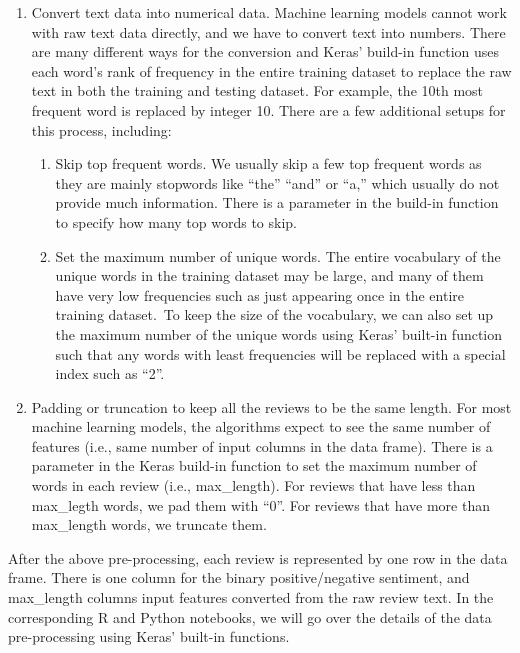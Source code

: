 \documentclass[
  12pt,
]{krantz}
\providecommand{\tightlist}{%
  \setlength{\itemsep}{0pt}\setlength{\parskip}{0pt}}
\begin{document}
\begin{enumerate}
\def\labelenumi{\arabic{enumi}.}
\tightlist
\item
  Convert text data into numerical data. Machine learning models cannot work with raw text data directly, and we have to convert text into numbers. There are many different ways for the conversion and Keras' build-in function uses each word's rank of frequency in the entire training dataset to replace the raw text in both the training and testing dataset. For example, the 10th most frequent word is replaced by integer 10. There are a few additional setups for this process, including:

  \begin{enumerate}
  \def\labelenumii{\alph{enumii}.}
  \tightlist
  \item
    Skip top frequent words. We usually skip a few top frequent words as they are mainly stopwords like ``the'' ``and'' or ``a,'' which usually do not provide much information. There is a parameter in the build-in function to specify how many top words to skip.\\
  \item
    Set the maximum number of unique words. The entire vocabulary of the unique words in the training dataset may be large, and many of them have very low frequencies such as just appearing once in the entire training dataset.~To keep the size of the vocabulary, we can also set up the maximum number of the unique words using Keras' built-in function such that any words with least frequencies will be replaced with a special index such as ``2''.
  \end{enumerate}
\item
  Padding or truncation to keep all the reviews to be the same length. For most machine learning models, the algorithms expect to see the same number of features (i.e., same number of input columns in the data frame). There is a parameter in the Keras build-in function to set the maximum number of words in each review (i.e., max\_length). For reviews that have less than max\_legth words, we pad them with ``0''. For reviews that have more than max\_length words, we truncate them.
\end{enumerate}

After the above pre-processing, each review is represented by one row in the data frame. There is one column for the binary positive/negative sentiment, and max\_length columns input features converted from the raw review text. In the corresponding R and Python notebooks, we will go over the details of the data pre-processing using Keras' built-in functions.
\end{document}
